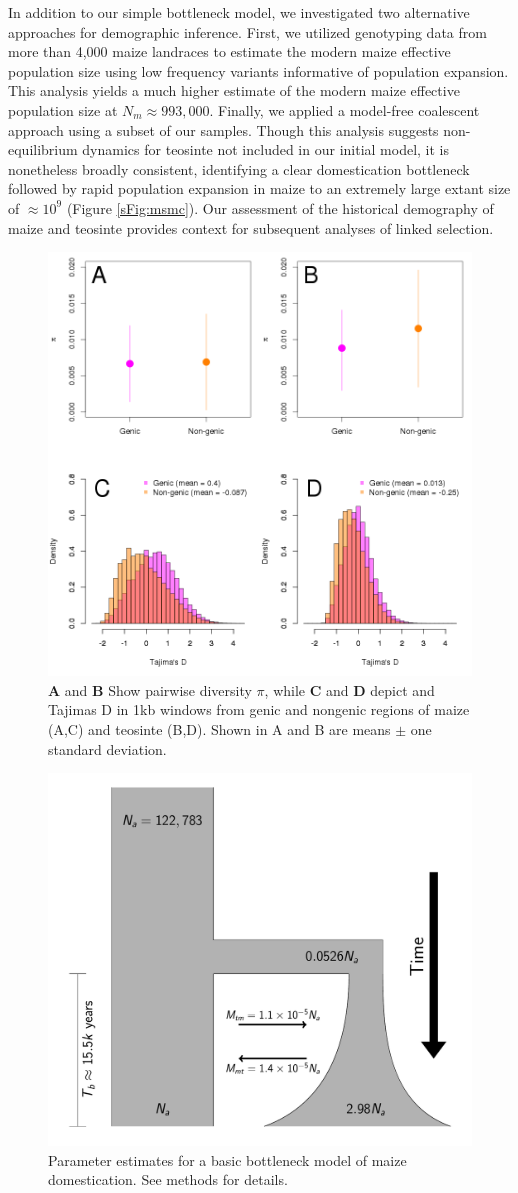 \documentclass{pnastwo}
\begin{document}
\begin{article}
In addition to our simple bottleneck model, we investigated two alternative approaches for demographic inference.  First, we utilized genotyping data from more than 4,000 maize landraces \cite{Hearne2015} to estimate the modern maize effective population size using low frequency variants  informative of population expansion. 
This analysis yields a much higher estimate of the modern maize effective population size at  $N_m \approx 993,000$.
Finally, we applied a model-free coalescent approach \cite{schiffels2014} using a subset of our samples. 
Though this analysis suggests non-equilibrium dynamics for teosinte not included in our initial model, it is nonetheless broadly consistent, identifying a clear domestication bottleneck followed by rapid population expansion in maize to an extremely large extant size of $\approx 10^9$ (Figure \ref{sFig:msmc}).
Our assessment of the historical demography of maize and teosinte provides context for subsequent analyses of linked selection.


\begin{figure}[!tb]
  \begin{center}
  \includegraphics[width=.45\textwidth] {FigsAndFiles/Pi_and_Tajima.png}
\end{center}
\caption{\textbf{A} and \textbf{B} Show pairwise diversity $\pi$, while \textbf{C} and \textbf{D} depict and Tajimas D in 1kb windows from genic and nongenic regions of maize (A,C) and teosinte (B,D). Shown in A and B are means $\pm$ one standard deviation.   \label{fig:diversity} }
\end{figure}


\begin{figure}[!tb]
\centering
\includegraphics[width=.5\textwidth]{FigsAndFiles/DomesticationModel/domesticationModel.pdf}
\caption{Parameter estimates for a basic bottleneck model of maize domestication. See methods for details. \label{fig:bottleneck} }
\end{figure}



\end{article}
\end{document}
